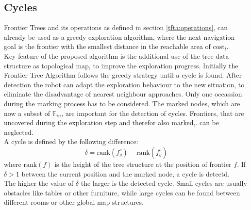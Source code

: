 \documentclass[twocolumn]{svjour3}[2016]
\begin{document}
\subsection{Cycles}
Frontier Trees and its operations as defined in section \ref{tfta:operations}, can already be used as a greedy exploration algorithm, where the next navigation goal is the frontier with the smallest distance in the reachable area of $\textrm{cost}_l$.\\
Key feature of the proposed algorithm is the additional use of the tree data structure as topological map, to improve the exploration progress. Initially the Frontier Tree Algorithm follows the greedy strategy until a cycle is found. After detection the robot can adapt the exploration behaviour to the new situation, to eliminate the disadvantage of nearest neighbour approaches. Only one occassion during the marking process has to be considered. The marked nodes, which are now a subset of $\mathbb{F}_{in}$, are important for the detection of cycles. Frontiers, that are uncovered during the exploration step and therefor also marked,. can be neglected.\\
A cycle is defined by the following difference:
\begin{equation}
\delta = \textrm{rank}(f^c_g)-\textrm{rank}(f^i_g)
\end{equation}
where $\textrm{rank}(f)$ is the height of the tree structure at the position of frontier $f$. If $\delta > 1$ between the current position and the marked node, a cycle is detectd.\\
The higher the value of $\delta$ the larger is the detected cycle. Small cycles are usually obstacles like tables or other furniture, while large cycles can be found between different rooms or other global map structures.\\
\end{document}
